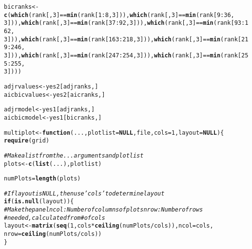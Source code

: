\documentclass{article}\usepackage[]{graphicx}\usepackage[]{color}
\makeatletter
\newcommand{\hlnum}[1]{\textcolor[rgb]{0.686,0.059,0.569}{#1}}%
\newcommand{\hlcom}[1]{\textcolor[rgb]{0.678,0.584,0.686}{\textit{#1}}}%
\newcommand{\hlopt}[1]{\textcolor[rgb]{0,0,0}{#1}}%
\newcommand{\hlstd}[1]{\textcolor[rgb]{0.345,0.345,0.345}{#1}}%
\newcommand{\hlkwa}[1]{\textcolor[rgb]{0.161,0.373,0.58}{\textbf{#1}}}%
\newcommand{\hlkwb}[1]{\textcolor[rgb]{0.69,0.353,0.396}{#1}}%
\newcommand{\hlkwc}[1]{\textcolor[rgb]{0.333,0.667,0.333}{#1}}%
\newcommand{\hlkwd}[1]{\textcolor[rgb]{0.737,0.353,0.396}{\textbf{#1}}}%
\newenvironment{kframe}{%
 \def\at@end@of@kframe{}%
 \ifinner\ifhmode%
  \def\at@end@of@kframe{\end{minipage}}%
  \begin{minipage}{\columnwidth}%
 \fi\fi%
 \def\FrameCommand##1{\hskip\@totalleftmargin \hskip-\fboxsep
 \colorbox{shadecolor}{##1}\hskip-\fboxsep
     \hskip-\linewidth \hskip-\@totalleftmargin \hskip\columnwidth}%
 \MakeFramed {\advance\hsize-\width
   \@totalleftmargin\z@ \linewidth\hsize
   \@setminipage}}%
 {\par\unskip\endMakeFramed%
 \at@end@of@kframe}
\newenvironment{knitrout}{}{} %
\makeatother
\begin{document}
\begin{knitrout}
\begin{kframe}
\begin{alltt}
\hlstd{bicranks} \hlkwb{<-} \hlkwd{c}\hlstd{(}\hlkwd{which}\hlstd{(rank[,} \hlnum{3}\hlstd{]} \hlopt{==} \hlkwd{min}\hlstd{(rank[}\hlnum{1}\hlopt{:}\hlnum{8}\hlstd{,} \hlnum{3}\hlstd{])),} \hlkwd{which}\hlstd{(rank[,} \hlnum{3}\hlstd{]} \hlopt{==} \hlkwd{min}\hlstd{(rank[}\hlnum{9}\hlopt{:}\hlnum{36}\hlstd{,}
    \hlnum{3}\hlstd{])),} \hlkwd{which}\hlstd{(rank[,} \hlnum{3}\hlstd{]} \hlopt{==} \hlkwd{min}\hlstd{(rank[}\hlnum{37}\hlopt{:}\hlnum{92}\hlstd{,} \hlnum{3}\hlstd{])),} \hlkwd{which}\hlstd{(rank[,} \hlnum{3}\hlstd{]} \hlopt{==} \hlkwd{min}\hlstd{(rank[}\hlnum{93}\hlopt{:}\hlnum{162}\hlstd{,}
    \hlnum{3}\hlstd{])),} \hlkwd{which}\hlstd{(rank[,} \hlnum{3}\hlstd{]} \hlopt{==} \hlkwd{min}\hlstd{(rank[}\hlnum{163}\hlopt{:}\hlnum{218}\hlstd{,} \hlnum{3}\hlstd{])),} \hlkwd{which}\hlstd{(rank[,} \hlnum{3}\hlstd{]} \hlopt{==} \hlkwd{min}\hlstd{(rank[}\hlnum{219}\hlopt{:}\hlnum{246}\hlstd{,}
    \hlnum{3}\hlstd{])),} \hlkwd{which}\hlstd{(rank[,} \hlnum{3}\hlstd{]} \hlopt{==} \hlkwd{min}\hlstd{(rank[}\hlnum{247}\hlopt{:}\hlnum{254}\hlstd{,} \hlnum{3}\hlstd{])),} \hlkwd{which}\hlstd{(rank[,} \hlnum{3}\hlstd{]} \hlopt{==} \hlkwd{min}\hlstd{(rank[}\hlnum{255}\hlopt{:}\hlnum{255}\hlstd{,}
    \hlnum{3}\hlstd{])))}

\hlstd{adjrvalues} \hlkwb{<-} \hlstd{yes2[adjranks, ]}
\hlstd{aicbicvalues} \hlkwb{<-} \hlstd{yes2[aicranks, ]}

\hlstd{adjrmodel} \hlkwb{<-} \hlstd{yes1[adjranks, ]}
\hlstd{aicbicmodel} \hlkwb{<-} \hlstd{yes1[bicranks, ]}

\hlstd{multiplot} \hlkwb{<-} \hlkwa{function}\hlstd{(}\hlkwc{...}\hlstd{,} \hlkwc{plotlist} \hlstd{=} \hlkwa{NULL}\hlstd{,} \hlkwc{file}\hlstd{,} \hlkwc{cols} \hlstd{=} \hlnum{1}\hlstd{,} \hlkwc{layout} \hlstd{=} \hlkwa{NULL}\hlstd{) \{}
    \hlkwd{require}\hlstd{(grid)}

    \hlcom{# Make a list from the ... arguments and plotlist}
    \hlstd{plots} \hlkwb{<-} \hlkwd{c}\hlstd{(}\hlkwd{list}\hlstd{(...), plotlist)}

    \hlstd{numPlots} \hlkwb{=} \hlkwd{length}\hlstd{(plots)}

    \hlcom{# If layout is NULL, then use 'cols' to determine layout}
    \hlkwa{if} \hlstd{(}\hlkwd{is.null}\hlstd{(layout)) \{}
        \hlcom{# Make the panel ncol: Number of columns of plots nrow: Number of rows}
        \hlcom{# needed, calculated from # of cols}
        \hlstd{layout} \hlkwb{<-} \hlkwd{matrix}\hlstd{(}\hlkwd{seq}\hlstd{(}\hlnum{1}\hlstd{, cols} \hlopt{*} \hlkwd{ceiling}\hlstd{(numPlots}\hlopt{/}\hlstd{cols)),} \hlkwc{ncol} \hlstd{= cols,}
            \hlkwc{nrow} \hlstd{=} \hlkwd{ceiling}\hlstd{(numPlots}\hlopt{/}\hlstd{cols))}
    \hlstd{\}}


\end{alltt}
\end{kframe}
\end{knitrout}
\end{document}
